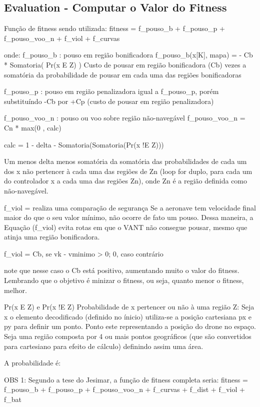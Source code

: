 \documentclass{article}
\begin{document}
\subsection{Evaluation - Computar o Valor do Fitness}
Função de fitness sendo utilizada:
fitness = f_pouso_b + f_pouso_p + f_pouso_voo_n + f_viol + f_curvas

onde:
f_pouso_b : pouso em região bonificadora
f_pouso_b(x[K], mapa) = - Cb * Somatoria( Pr(x E Z) )
Custo de pousar em região bonificadora (Cb) vezes a somatória da probabilidade de pousar em cada uma das regiões bonificadoras

f_pouso_p : pouso em região penalizadora
igual a f_pouso_p, porém substituíndo -Cb por +Cp (custo de pousar em região penalizadora)


f_pouso_voo_n : pouso ou voo sobre região não-navegável
f_pouso_voo_n = Cn * max(0 , calc)

calc = 1 - delta - Somatoria(Somatoria(Pr(x !E Z)))

Um menos delta menos somatória da somatória das probabilidades de cada um dos x não pertencer à cada uma das regiões de Zn  (loop for duplo, para cada um do controlador x a cada uma das regiões Zn), onde Zn é a região definida como não-navegável.


f_viol = realiza uma comparação de segurança
Se a aeronave tem velocidade final maior do que o seu valor mínimo, não ocorre de fato um pouso. Dessa maneira, a Equação (f_viol) evita rotas em que o VANT não consegue pousar, mesmo que atinja uma região bonificadora.

f_viol =    Cb, se vk - vminimo > 0; 
0, caso contrário

note que nesse caso o Cb está positivo, aumentando muito o valor do fitness. Lembrando que o objetivo é minizar o fitness, ou seja, quanto menor o fitness, melhor.


Pr(x E Z) e Pr(x !E Z) Probabilidade de x pertencer ou não à uma região Z:
Seja x o elemento decodificado (definido no ínicio) utiliza-se a posição cartesiana px e py para definir um ponto. Ponto este representando a posição do drone no espaço. Seja uma região composta por 4 ou mais pontos geográficos (que são convertidos para cartesiano para efeito de cálculo) definindo assim uma área.

A probabilidade é:





OBS 1: Segundo a tese do Jesimar, a função de fitness completa seria:
fitness = f_pouso_b + f_pouso_p + f_pouso_voo_n + f_curvas + f_dist + f_viol + f_bat
\end{document}
